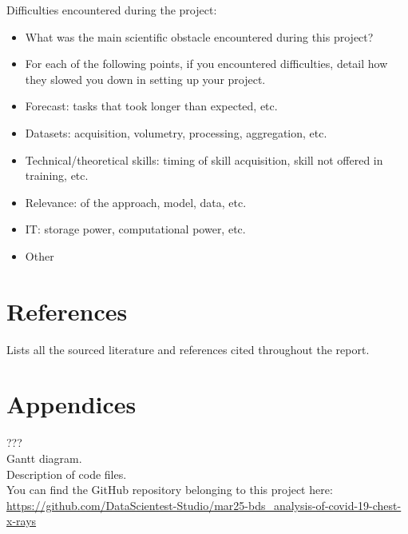 \documentclass{article}
\begin{document}
Difficulties encountered during the project: 
\begin{itemize}
    \item What was the main scientific obstacle encountered during this project?
    \item For each of the following points, if you encountered difficulties, detail how they slowed you down in setting up your project.
    \item Forecast: tasks that took longer than expected, etc.
    \item Datasets: acquisition, volumetry, processing, aggregation, etc.
    \item Technical/theoretical skills: timing of skill acquisition, skill not offered in training, etc.
    \item Relevance: of the approach, model, data, etc.
    \item IT: storage power, computational power, etc.
    \item Other
\end{itemize}



\section{References}

Lists all the sourced literature and references cited throughout the report.

\section{Appendices}

??? \\
Gantt diagram. \\
Description of code files. \\
You can find the GitHub repository belonging to this project here: 
\url{https://github.com/DataScientest-Studio/mar25-bds_analysis-of-covid-19-chest-x-rays} 
\end{document}
